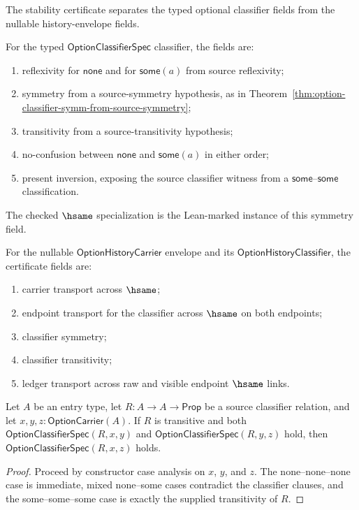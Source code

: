 \begin{definition}
\label{def:option-stability-certificate}
The stability certificate separates the typed optional classifier fields from
the nullable history-envelope fields.

For the typed $\mathsf{OptionClassifierSpec}$ classifier, the fields are:
\begin{enumerate}
  \item reflexivity for $\mathsf{none}$ and for $\mathsf{some}(a)$ from source reflexivity;
  \item symmetry from a source-symmetry hypothesis, as in Theorem~\ref{thm:option-classifier-symm-from-source-symmetry};
  \item transitivity from a source-transitivity hypothesis;
  \item no-confusion between $\mathsf{none}$ and $\mathsf{some}(a)$ in either order;
  \item present inversion, exposing the source classifier witness from a $\mathsf{some}$--$\mathsf{some}$ classification.
\end{enumerate}
The checked $\hsame$ specialization is the Lean-marked instance of this
symmetry field.

For the nullable $\mathsf{OptionHistoryCarrier}$ envelope and its
$\mathsf{OptionHistoryClassifier}$, the certificate fields are:
\begin{enumerate}
  \item carrier transport across $\hsame$;
  \item endpoint transport for the classifier across $\hsame$ on both endpoints;
  \item classifier symmetry;
  \item classifier transitivity;
  \item ledger transport across raw and visible endpoint $\hsame$ links.
\end{enumerate}
\end{definition}

\begin{theorem}
\label{thm:option-classifier-transitivity}
Let $A$ be an entry type, let $R:A\to A\to\mathsf{Prop}$ be a source
classifier relation, and let $x,y,z:\mathsf{OptionCarrier}(A)$. If $R$ is
transitive and both $\mathsf{OptionClassifierSpec}(R,x,y)$ and
$\mathsf{OptionClassifierSpec}(R,y,z)$ hold, then
$\mathsf{OptionClassifierSpec}(R,x,z)$ holds.
\end{theorem}
\begin{proof}
Proceed by constructor case analysis on $x$, $y$, and $z$.  The none--none--none
case is immediate, mixed none--some cases contradict the classifier clauses, and
the some--some--some case is exactly the supplied transitivity of $R$.
\end{proof}

